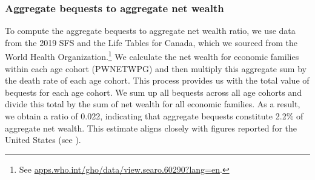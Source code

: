 \subsubsection{Aggregate bequests to aggregate net wealth}

To compute the aggregate bequests to aggregate net wealth ratio, we use data from the 2019 SFS and the Life Tables for Canada, which we sourced from the World Health Organization.\footnote{See \url{apps.who.int/gho/data/view.searo.60290?lang=en}.} We calculate the net wealth for economic families within each age cohort (PWNETWPG) and then multiply this aggregate sum by the death rate of each age cohort. This process provides us with the total value of bequests for each age cohort. We sum up all bequests across all age cohorts and divide this total by the sum of net wealth for all economic families. As a result, we obtain a ratio of 0.022, indicating that aggregate bequests constitute 2.2\% of aggregate net wealth. This estimate aligns closely with figures reported for the United States (see \citet{cagetti-denardi-2006}).